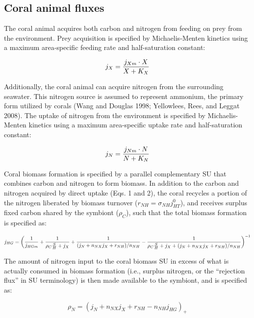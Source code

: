 \documentclass[]{elsarticle} %
\begin{document}
\subsection{Coral animal fluxes}\label{coral-animal-fluxes}

The coral animal acquires both carbon and nitrogen from feeding on prey
from the environment. Prey acquisition is specified by Michaelis-Menten
kinetics using a maximum area-specific feeding rate and half-saturation
constant:

\begin{equation} j_X = {{j_{Xm} \cdot X} \over {X + K_X}} \end{equation}

Additionally, the coral animal can acquire nitrogen from the surrounding
seawater. This nitrogen source is assumed to represent ammonium, the
primary form utilized by corals (Wang and Douglas 1998; Yellowlees,
Rees, and Leggat 2008). The uptake of nitrogen from the environment is
specified by Michaelis-Menten kinetics using a maximum area-specific
uptake rate and half-saturation constant:

\begin{equation} j_N = {{j_{Nm} \cdot N} \over {N + K_N}} \end{equation}

Coral biomass formation is specified by a parallel complementary SU that
combines carbon and nitrogen to form biomass. In addition to the carbon
and nitrogen acquired by direct uptake (Eqs. 1 and 2), the coral
recycles a portion of the nitrogen liberated by biomass turnover
(\(r_{NH}=\sigma_{NH}j_{HT}^0\)), and receives surplus fixed carbon
shared by the symbiont (\(\rho_C\)), such that the total biomass
formation is specified as:

\begin{equation} j_{HG} = \bigg({1 \over j_{HGm}} + {1 \over {\rho_C{S \over H} + j_X}} + {1 \over {(j_N + n_{NX}j_X + r_{NH}) / n_{NH}}} - {1 \over {{\rho_C{S \over H} + j_X} + (j_N + n_{NX}j_X + r_{NH}) / n_{NH}}}\bigg)^{-1} \end{equation}

The amount of nitrogen input to the coral biomass SU in excess of what
is actually consumed in biomass formation (i.e., surplus nitrogen, or
the ``rejection flux'' in SU terminology) is then made available to the
symbiont, and is specified as:

\begin{equation} \rho_N = (j_N + n_{NX}j_X + r_{NH} - n_{NH}j_{HG})_+ \end{equation}
\end{document}
